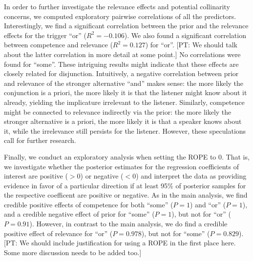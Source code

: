 \documentclass{sp}
\newcommand{\pt}[1]{\textcolor{Cerulean}{[PT: #1]}}
\begin{document}
In order to further investigate the relevance effects and potential collinarity concerns, we computed exploratory pairwise correlations of all the predictors. Interestingly, we find a significant correlation between the prior and the relevance effects for the trigger ``or'' ($R^2 = -0.106$). We also found a significant correlation between competence and relevance ($R^2 = 0.127$) for ``or''. \pt{We should talk about the latter correlation in more detail at some point.} No correlations were found for ``some''. These intriguing results might indicate that these effects are closely related for disjunction. Intuitively, a negative correlation between prior and relevance of the stronger alternative ``and'' makes sense: the more likely the conjunction is a priori, the more likely it is that the listener might know about it already, yielding the implicature irrelevant to the listener. Similarly, competence might be connected to relevance indirectly via the prior: the more likely the stronger alternative is a priori, the more likely it is that a speaker knows about it, while the irrelevance still persists for the listener. However, these speculations call for further research.

Finally, we conduct an exploratory analysis when setting the ROPE to 0. That is, we investigate whether the posterior estimates for the regression coefficients of interest are positive ($>0$) or negative ($<0$) and interpret the data as providing evidence in favor of a particular direction if at least 95\% of posterior samples for the respective coefficent are positive or negative. As in the main analysis, we find credible positive effects of competence for both ``some'' ($P = 1$) and ``or'' ($P = 1$), and a credible negative effect of prior for ``some'' ($P = 1$), but not for ``or'' ($P=0.91$). However, in contrast to the main analysis, we do find a credible positive effect of relevance for ``or'' ($P=0.978$), but not for ``some'' ($P=0.829$). \pt{We should include justification for using a ROPE in the first place here. Some more discussion needs to be added too.} 
\end{document}
